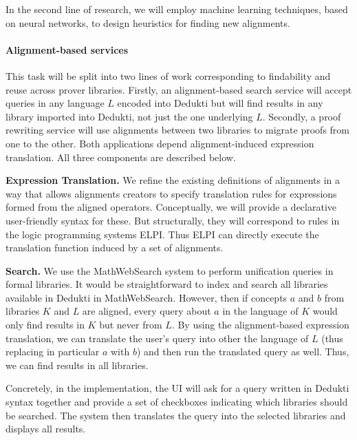 In the second line of research, we will employ machine learning
techniques, based on neural networks, to design heuristics for finding
new alignments.

\paragraph{Alignment-based services}

This task will be split into two lines of work corresponding to findability and reuse across prover libraries.
Firstly, an alignment-based search service will accept queries in any language $L$ encoded into Dedukti but will find results in any library imported into Dedukti, not just the one underlying $L$.
Secondly, a proof rewriting service will use alignments between two libraries to migrate proofs from one to the other.
Both applications depend alignment-induced expression translation.
All three components are described below.

\textbf{Expression Translation.}
We refine the existing definitions of alignments in a way that allows alignments creators to specify translation rules for expressions formed from the aligned operators.
Conceptually, we will provide a declarative user-friendly syntax for these.
But structurally, they will correspond to rules in the logic programming systems ELPI.
Thus ELPI can directly execute the translation function induced by a set of alignments.

\textbf{Search.}
We use the MathWebSearch system to perform unification queries in formal libraries.
It would be straightforward to index and search all libraries available in Dedukti in MathWebSearch.
However, then if concepts $a$ and $b$ from libraries $K$ and $L$ are aligned, every query about $a$ in the language of $K$ would only find results in $K$ but never from $L$.
By using the alignment-based expression translation, we can translate the user's query into other the language of $L$ (thus replacing in particular $a$ with $b$) and then run the translated query as well.
Thus, we can find results in all libraries.

Concretely, in the implementation, the UI will ask for a query written in Dedukti syntax together and provide a set of checkboxes indicating which libraries should be searched.
The system then translates the query into the selected libraries and displays all results.

